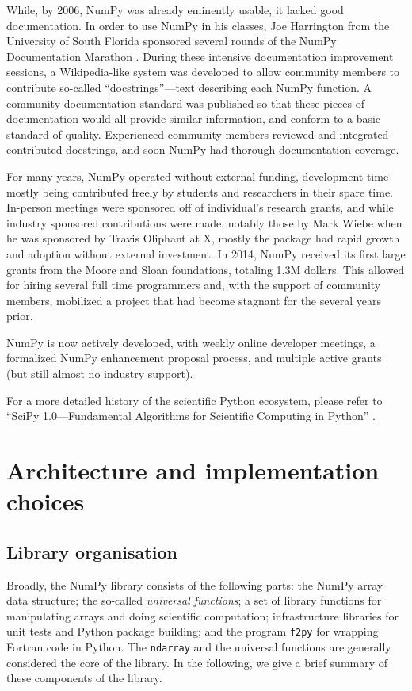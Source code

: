 \documentclass[fleqn,10pt]{wlscirep}
\newcommand{\code}[1]{\texttt{#1}}
\begin{document}
While, by 2006, NumPy was already eminently usable, it lacked good
documentation. In order to use NumPy in his classes, Joe Harrington
from the University of South Florida sponsored several rounds of the
NumPy Documentation Marathon \cite{harrington2008scipy,vanderwalt2008scipy}.
During these intensive
documentation improvement sessions, a Wikipedia-like system was
developed to allow community members to contribute so-called
``docstrings''—text describing each NumPy function. A community
documentation standard was published so that these pieces of
documentation would all provide similar information, and conform to a
basic standard of quality. Experienced community members reviewed and
integrated contributed docstrings, and soon NumPy had thorough
documentation coverage.

For many years, NumPy operated without external funding, development
time mostly being contributed freely by students and researchers in
their spare time.  In-person meetings were sponsored off of
individual's research grants, and while industry sponsored
contributions were made, notably those by Mark Wiebe when he was
sponsored by Travis Oliphant at X, mostly the package had rapid growth
and adoption without external investment.  In 2014, NumPy received its
first large grants from the Moore and Sloan foundations, totaling 1.3M
dollars.  This allowed for hiring several full time programmers and,
with the support of community members, mobilized a project that had
become stagnant for the several years prior.

NumPy is now actively developed, with weekly online developer
meetings, a formalized NumPy enhancement proposal process, and
multiple active grants (but still almost no industry support).

For a more detailed history of the scientific Python ecosystem, please
refer to ``SciPy 1.0---Fundamental Algorithms for Scientific Computing
in Python'' \cite{virtanen2019scipy}.

\section*{Architecture and implementation choices}

\subsection*{Library organisation}
Broadly, the NumPy library consists of the following parts:
the NumPy array data structure; the so-called \emph{universal functions};
a set of library functions for manipulating arrays and doing scientific
computation; infrastructure libraries for unit tests and Python package
building; and the program \code{f2py} for wrapping Fortran code in Python.
The \code{ndarray} and the universal functions are generally considered
the core of the library.
In the following, we give a brief summary of these components of the
library.
\end{document}
